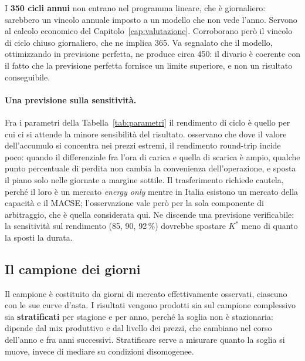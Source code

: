 I \textbf{350 cicli annui} non entrano nel programma lineare, che \`e giornaliero: sarebbero un
vincolo annuale imposto a un modello che non vede l'anno. Servono al calcolo economico del
Capitolo~\ref{cap:valutazione}. Corroborano per\`o il vincolo di ciclo chiuso giornaliero, che
ne implica 365. Va segnalato che il modello, ottimizzando in previsione perfetta, ne produce
circa 450: il divario \`e coerente con il fatto che la previsione perfetta fornisce un limite
superiore, e non un risultato conseguibile.

\paragraph{Una previsione sulla sensitivit\`a.} Fra i parametri della
Tabella~\ref{tab:parametri} il rendimento di ciclo \`e quello per cui ci si attende la
minore sensibilit\`a del risultato. \textcite{mcconnell2015storage} osservano che dove il
valore dell'accumulo si concentra nei prezzi estremi, il rendimento round-trip incide
poco: quando il differenziale fra l'ora di carica e quella di scarica \`e ampio, qualche
punto percentuale di perdita non cambia la convenienza dell'operazione, e sposta il piano
solo nelle giornate a margine sottile. Il trasferimento richiede cautela, perch\'e il loro
\`e un mercato \emph{energy only} mentre in Italia esistono un mercato della capacit\`a e
il \ac{MACSE}; l'osservazione vale per\`o per la sola componente di arbitraggio, che \`e
quella considerata qui. Ne discende una previsione verificabile: la sensitivit\`a sul
rendimento (85, 90, 92\,\%) dovrebbe spostare $K^*$ meno di quanto la sposti la durata.

\subsection{Il campione dei giorni}

Il campione \`e costituito da giorni di mercato effettivamente osservati, ciascuno con le sue
curve d'asta. I risultati vengono prodotti sia sul campione complessivo sia
\textbf{stratificati} per stagione e per anno, perch\'e la soglia non \`e stazionaria: dipende
dal mix produttivo e dal livello dei prezzi, che cambiano nel corso dell'anno e fra anni
successivi. Stratificare serve a misurare quanto la soglia si muove, invece di mediare su
condizioni disomogenee.


